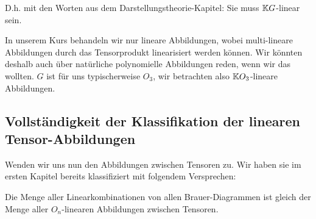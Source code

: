 \begin{remark}
D.h. mit den Worten aus dem Darstellungstheorie-Kapitel: Sie muss $\mathbb{K} G$-linear sein.
\end{remark}

\begin{remark}
In unserem Kurs behandeln wir nur lineare Abbildungen, wobei multi-lineare Abbildungen durch das Tensorprodukt linearisiert werden können. Wir könnten deshalb auch über natürliche polynomielle Abbildungen reden, wenn wir das wollten. $G$ ist für uns typischerweise $O_3$, wir betrachten also $\mathbb{K} O_3$-lineare Abbildungen.
\end{remark}

\subsection{Vollständigkeit der Klassifikation der linearen Tensor-Abbildungen}
Wenden wir uns nun den Abbildungen zwischen Tensoren zu. Wir haben sie im ersten Kapitel bereits klassifiziert mit folgendem Versprechen:
\begin{theorem}
	\label{brauer:klassifikation}
	Die Menge aller Linearkombinationen von allen Brauer-Diagrammen ist gleich der Menge aller $O_n$-linearen Abbildungen zwischen Tensoren.
\end{theorem}
